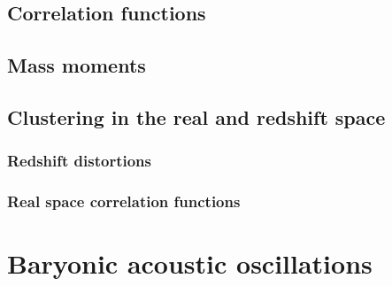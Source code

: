 \subsection{ Correlation functions }
\subsection{ Mass moments }
\subsection{ Clustering in the real and redshift space }
\subsubsection{ Redshift distortions }
\subsubsection{ Real space correlation functions }

\section{ Baryonic acoustic oscillations }
 
